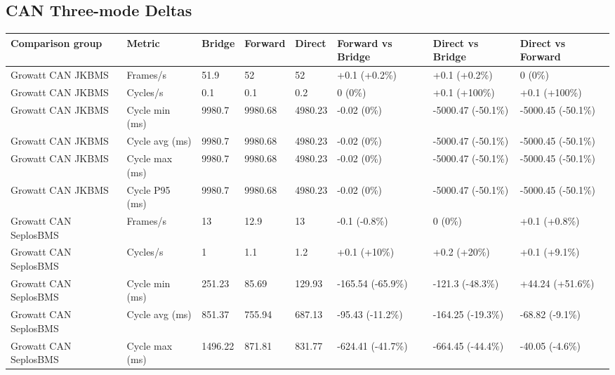 \documentclass[11pt,a4paper]{article}
\newcommand{\increase}[1]{\textcolor{increasecolor}{#1}}
\newcommand{\decrease}[1]{\textcolor{decreasecolor}{#1}}
\begin{document}
\begin{landscape}
\subsection{CAN Three-mode Deltas}
\begingroup
\scriptsize
\setlength{\tabcolsep}{3pt}
\setlength{\LTpre}{0.35em}
\setlength{\LTpost}{0.45em}
\begin{longtable}{@{}L{5.0cm}L{4.0cm}L{1.65cm}L{1.65cm}L{1.65cm}L{2.8cm}L{2.8cm}L{2.8cm}@{}}
\toprule
Comparison group & Metric & Bridge & Forward & Direct & Forward vs Bridge & Direct vs Bridge & Direct vs Forward \\
\midrule
\endhead
Growatt CAN JKBMS & Frames/s & 51.9 & 52 & 52 & \increase{+0.1 (+0.2\%)} & \increase{+0.1 (+0.2\%)} & 0 (0\%) \\
Growatt CAN JKBMS & Cycles/s & 0.1 & 0.1 & 0.2 & 0 (0\%) & \increase{+0.1 (+100\%)} & \increase{+0.1 (+100\%)} \\
Growatt CAN JKBMS & Cycle min (ms) & 9980.7 & 9980.68 & 4980.23 & \decrease{-0.02 (0\%)} & \decrease{-5000.47 (-50.1\%)} & \decrease{-5000.45 (-50.1\%)} \\
Growatt CAN JKBMS & Cycle avg (ms) & 9980.7 & 9980.68 & 4980.23 & \decrease{-0.02 (0\%)} & \decrease{-5000.47 (-50.1\%)} & \decrease{-5000.45 (-50.1\%)} \\
Growatt CAN JKBMS & Cycle max (ms) & 9980.7 & 9980.68 & 4980.23 & \decrease{-0.02 (0\%)} & \decrease{-5000.47 (-50.1\%)} & \decrease{-5000.45 (-50.1\%)} \\
Growatt CAN JKBMS & Cycle P95 (ms) & 9980.7 & 9980.68 & 4980.23 & \decrease{-0.02 (0\%)} & \decrease{-5000.47 (-50.1\%)} & \decrease{-5000.45 (-50.1\%)} \\
Growatt CAN SeplosBMS & Frames/s & 13 & 12.9 & 13 & \decrease{-0.1 (-0.8\%)} & 0 (0\%) & \increase{+0.1 (+0.8\%)} \\
Growatt CAN SeplosBMS & Cycles/s & 1 & 1.1 & 1.2 & \increase{+0.1 (+10\%)} & \increase{+0.2 (+20\%)} & \increase{+0.1 (+9.1\%)} \\
Growatt CAN SeplosBMS & Cycle min (ms) & 251.23 & 85.69 & 129.93 & \decrease{-165.54 (-65.9\%)} & \decrease{-121.3 (-48.3\%)} & \increase{+44.24 (+51.6\%)} \\
Growatt CAN SeplosBMS & Cycle avg (ms) & 851.37 & 755.94 & 687.13 & \decrease{-95.43 (-11.2\%)} & \decrease{-164.25 (-19.3\%)} & \decrease{-68.82 (-9.1\%)} \\
Growatt CAN SeplosBMS & Cycle max (ms) & 1496.22 & 871.81 & 831.77 & \decrease{-624.41 (-41.7\%)} & \decrease{-664.45 (-44.4\%)} & \decrease{-40.05 (-4.6\%)} \\

\end{longtable}
\end{landscape}
\end{document}
